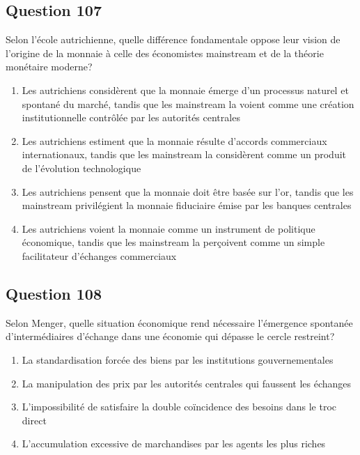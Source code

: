 \documentclass[12pt,a4paper]{article}
\begin{document}
\subsection*{Question 107}
Selon l'école autrichienne, quelle différence fondamentale oppose leur vision de l'origine de la monnaie à celle des économistes mainstream et de la théorie monétaire moderne?

\begin{enumerate}[label=\Alph*., leftmargin=*]
\item Les autrichiens considèrent que la monnaie émerge d'un processus naturel et spontané du marché, tandis que les mainstream la voient comme une création institutionnelle contrôlée par les autorités centrales
\item Les autrichiens estiment que la monnaie résulte d'accords commerciaux internationaux, tandis que les mainstream la considèrent comme un produit de l'évolution technologique
\item Les autrichiens pensent que la monnaie doit être basée sur l'or, tandis que les mainstream privilégient la monnaie fiduciaire émise par les banques centrales
\item Les autrichiens voient la monnaie comme un instrument de politique économique, tandis que les mainstream la perçoivent comme un simple facilitateur d'échanges commerciaux
\end{enumerate}

\bigskip


\subsection*{Question 108}
Selon Menger, quelle situation économique rend nécessaire l'émergence spontanée d'intermédiaires d'échange dans une économie qui dépasse le cercle restreint?

\begin{enumerate}[label=\Alph*., leftmargin=*]
\item La standardisation forcée des biens par les institutions gouvernementales
\item La manipulation des prix par les autorités centrales qui faussent les échanges
\item L'impossibilité de satisfaire la double coïncidence des besoins dans le troc direct
\item L'accumulation excessive de marchandises par les agents les plus riches
\end{enumerate}

\bigskip
\end{document}
